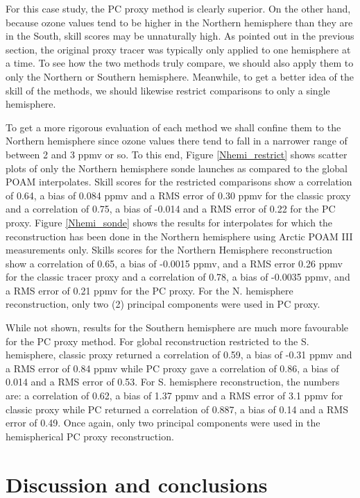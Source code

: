 For this case study, the PC proxy method is clearly superior. On the other
hand, because ozone values tend to be higher in the Northern hemisphere than
they are in the South, skill scores may be unnaturally high.
As pointed out in the previous section, the original proxy tracer was 
typically only applied to one hemisphere at a time.
To see how the two methods truly compare, we should also apply them to only the
Northern or Southern hemisphere.
Meanwhile, to get a better idea of the skill of the methods, we should likewise
restrict comparisons to only a single hemisphere.

To get a more rigorous evaluation of each method we shall confine them
to the Northern hemisphere
since ozone values there tend to fall in a narrower range of 
between 2 and 3 ppmv or so.
To this end, Figure \ref{Nhemi_restrict} shows scatter plots of only the
Northern hemisphere sonde launches as compared to the global POAM interpolates.
Skill scores for the restricted comparisons show a correlation of 0.64,
a bias of 0.084 ppmv and a RMS error of 0.30 ppmv for the classic proxy
and a correlation of 0.75, a bias of -0.014 and a RMS error of 0.22 for
the PC proxy.
Figure \ref{Nhemi_sonde} shows the results for interpolates for which the
reconstruction has been done in the Northern hemisphere using 
Arctic POAM III measurements only.
Skills scores for the Northern Hemisphere reconstruction show a correlation
of 0.65, a bias of -0.0015 ppmv, and a RMS error 0.26 ppmv for the classic
tracer proxy and a correlation of 0.78, a bias of -0.0035 ppmv,
and a RMS error of 0.21 ppmv for the PC proxy.
For the N. hemisphere reconstruction, only two (2) principal components were
used in PC proxy.

While not shown, results for the Southern hemisphere are much more 
favourable for the PC proxy method.
For global reconstruction restricted to the S. hemisphere, classic proxy
returned a correlation of 0.59, a bias of -0.31 ppmv and a RMS error 
of 0.84 ppmv while PC proxy gave a correlation of 0.86, a bias of 0.014
and a RMS error of 0.53.
For S. hemisphere reconstruction, the numbers are: a correlation of 0.62,
a bias of 1.37 ppmv and a RMS error of 3.1 ppmv for classic proxy
while PC returned a correlation of 0.887, a bias of 0.14 and a RMS error
of 0.49.
Once again, only two principal components were used in the hemispherical PC
proxy reconstruction.

\section{Discussion and conclusions}

